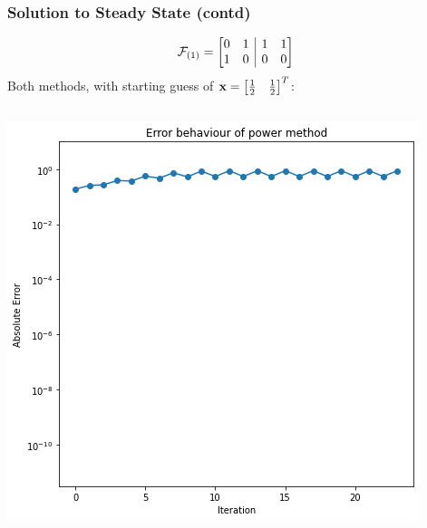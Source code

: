 \documentclass{beamer}
\begin{document}
\begin{frame}
  \frametitle{Solution to Steady State (contd)}
  \[ \mathcal{F}_{\left(1\right)} =
    \left[
      \begin{array}{@{}cc|cc@{}}
        0 & 1 & 1 & 1 \\
        1 & 0 & 0 & 0
      \end{array}
    \right]
  \]
  Both methods, with starting guess of ${\bf x} = \begin{bmatrix}\frac{1}{2} & \frac{1}{2}\end{bmatrix}^T$:

  \begin{columns}
    \begin{column}{0.5\linewidth}
      \includegraphics[width=\linewidth]{images/power.png}
    \end{column}


\end{columns}
\end{frame}
\end{document}

